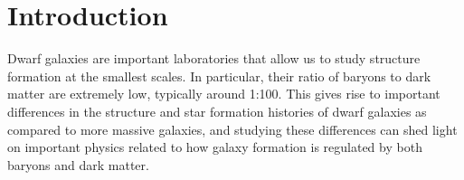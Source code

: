 \documentclass[iop]{emulateapj}
\begin{document}




\section{Introduction}
\label{intro}

Dwarf galaxies are important laboratories that allow us to study structure formation at the smallest scales. In particular, their ratio of baryons to dark matter are extremely low, typically around 1:100. This gives rise to important differences in the structure and star formation histories of dwarf galaxies as compared to more massive galaxies, and studying these differences can shed light on important physics related to how galaxy formation is regulated by both baryons and dark matter.
\end{document}
